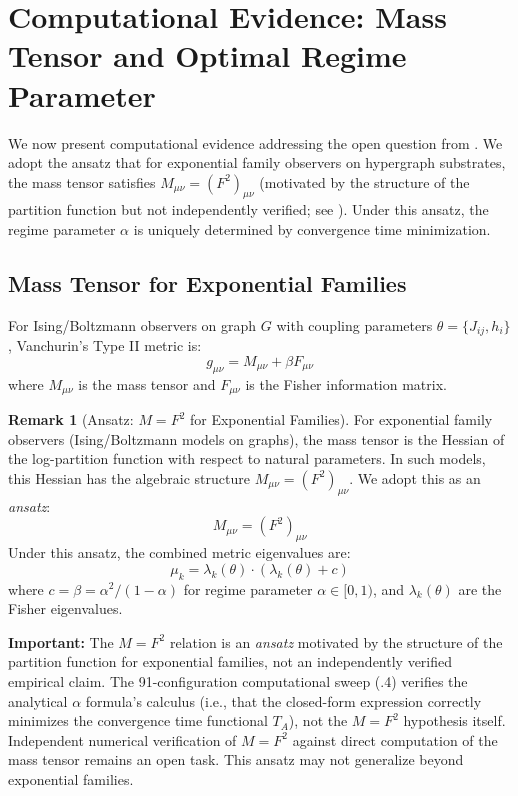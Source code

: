 \documentclass[11pt,a4paper]{article}
\theoremstyle{plain}
\theoremstyle{definition}
\newtheorem{remark}[theorem]{Remark}
\theoremstyle{remark}
\begin{document}

\section{Computational Evidence: Mass Tensor and Optimal Regime Parameter}
\label{sec:mass_tensor}

We now present computational evidence addressing the open question from . We adopt the ansatz that for exponential family observers on hypergraph substrates, the mass tensor satisfies $M_{\mu\nu} = (F^2)_{\mu\nu}$ (motivated by the structure of the partition function but not independently verified; see ). Under this ansatz, the regime parameter $\alpha$ is uniquely determined by convergence time minimization.

\subsection{Mass Tensor for Exponential Families}

For Ising/Boltzmann observers on graph $G$ with coupling parameters $\theta = \{J_{ij}, h_i\}$, Vanchurin's Type II metric is:
\begin{equation}
g_{\mu\nu} = M_{\mu\nu} + \beta F_{\mu\nu}
\end{equation}
where $M_{\mu\nu}$ is the mass tensor and $F_{\mu\nu}$ is the Fisher information matrix.

\begin{remark}[Ansatz: $M = F^2$ for Exponential Families]
\label{rem:mass_tensor}
For exponential family observers (Ising/Boltzmann models on graphs), the mass tensor is the Hessian of the log-partition function with respect to natural parameters. In such models, this Hessian has the algebraic structure $M_{\mu\nu} = (F^2)_{\mu\nu}$. We adopt this as an \emph{ansatz}:
\begin{equation}
M_{\mu\nu} = (F^2)_{\mu\nu}
\end{equation}
Under this ansatz, the combined metric eigenvalues are:
\begin{equation}
\mu_k = \lambda_k(\theta) \cdot (\lambda_k(\theta) + c)
\end{equation}
where $c = \beta = \alpha^2/(1-\alpha)$ for regime parameter $\alpha \in [0,1)$, and $\lambda_k(\theta)$ are the Fisher eigenvalues.

\textbf{Important:} The $M = F^2$ relation is an \emph{ansatz} motivated by the structure of the partition function for exponential families, not an independently verified empirical claim. The 91-configuration computational sweep (.4) verifies the analytical $\alpha$ formula's calculus (i.e., that the closed-form expression correctly minimizes the convergence time functional $T_A$), not the $M = F^2$ hypothesis itself. Independent numerical verification of $M = F^2$ against direct computation of the mass tensor remains an open task. This ansatz may not generalize beyond exponential families.
\end{remark}
\end{document}
